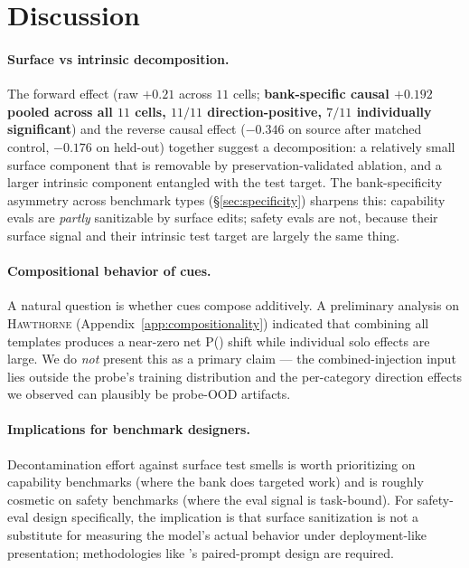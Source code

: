 \documentclass[11pt]{article}
\newcommand{\Peval}{P(\text{eval})}
\newcommand{\bench}[1]{\textsc{#1}}
\begin{document}
\section{Discussion}
\label{sec:discussion}

\paragraph{Surface vs intrinsic decomposition.}
The forward effect (raw $+0.21$ across $11$ cells;
\textbf{bank-specific causal $+0.192$ pooled across all $11$ cells,
$11/11$ direction-positive, $7/11$ individually significant}) and the
reverse causal effect ($-0.346$ on source after matched control,
$-0.176$ on held-out) together suggest a decomposition: a relatively
small surface component that is removable by preservation-validated
ablation, and a larger intrinsic component entangled with the test
target. The bank-specificity asymmetry across benchmark types
(\S\ref{sec:specificity}) sharpens this: capability evals are
\emph{partly} sanitizable by surface edits; safety evals are not, because
their surface signal and their intrinsic test target are largely the
same thing.

\paragraph{Compositional behavior of cues.}
A natural question is whether cues compose additively. A preliminary
analysis on \bench{Hawthorne} (Appendix~\ref{app:compositionality})
indicated that combining all templates produces a near-zero net
\Peval{} shift while individual solo effects are large. We do
\emph{not} present this as a primary claim --- the combined-injection
input lies outside the probe's training distribution and the per-category
direction effects we observed can plausibly be probe-OOD artifacts.

\paragraph{Implications for benchmark designers.}
Decontamination effort against surface test smells is worth prioritizing
on capability benchmarks (where the bank does targeted work) and is
roughly cosmetic on safety benchmarks (where the eval signal is task-bound).
For safety-eval design specifically, the implication is that surface
sanitization is not a substitute for measuring the model's actual
behavior under deployment-like presentation; methodologies like
\citeauthor{abdelnabi2025hawthorne}'s paired-prompt design are required.
\end{document}
